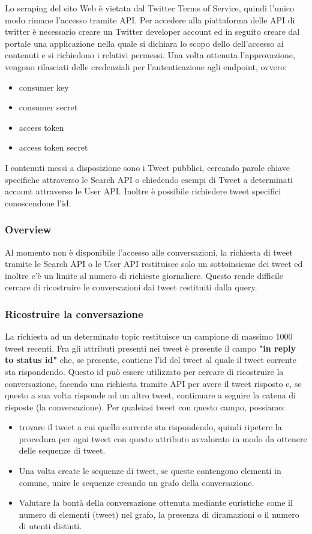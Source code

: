 Lo scraping del sito Web è vietata dal Twitter Terms of Service, quindi l'unico modo rimane l'accesso tramite API. Per accedere alla piattaforma delle API di twitter è necessario creare un Twitter developer account ed in seguito creare dal portale una applicazione nella quale si dichiara lo scopo dello dell'accesso ai contenuti e si richiedono i relativi permessi. Una volta ottenuta l'approvazione, vengono rilasciati delle credenziali per l'autenticazione agli endpoint, ovvero:

\begin{itemize}
    \item consumer key
    \item consumer secret
    \item access token
    \item access token secret
\end{itemize}

I contenuti messi a disposizione sono i Tweet pubblici, cercando parole chiave specifiche attraverso le Search API o chiedendo esempi di Tweet a determinati account attraverso le User API. Inoltre è possibile richiedere tweet specifici conoscendone l'id.

\subsubsection{Overview}
Al momento non è disponibile l'accesso alle conversazioni, la richiesta di tweet tramite le Search API o le User API restituisce solo un sottoinsieme dei tweet ed inoltre c'è un limite al numero di richieste giornaliere. Questo rende difficile cercare di ricostruire le conversazioni dai tweet restituiti dalla query. 

\subsubsection{Ricostruire la conversazione}
\label{ricostruire-conv}
La richiesta ad un determinato topic restituisce un campione di massimo 1000 tweet recenti.
Fra gli attributi presenti nei tweet è presente il campo \textbf{"in reply to status id"} che, se presente, contiene l'id del tweet al quale il tweet corrente sta rispondendo. Questo id può essere utilizzato per cercare di ricostruire la conversazione, facendo una richiesta tramite API per avere il tweet risposto e, se questo a sua volta risponde ad un altro tweet, continuare a seguire la catena di risposte (la conversazione). Per qualsiasi tweet con questo campo, possiamo:
\begin{itemize}
    \item trovare il tweet a cui quello corrente sta rispondendo, quindi ripetere la procedura per ogni tweet con questo attributo avvalorato in modo da ottenere delle sequenze di tweet.
    \item Una volta create le sequenze di tweet, se queste contengono elementi in comune, unire le sequenze creando un grafo della conversazione.
    \item Valutare la bontà della conversazione ottenuta mediante euristiche come il numero di elementi (tweet) nel grafo, la presenza di diramazioni o il numero di utenti distinti.
\end{itemize}

